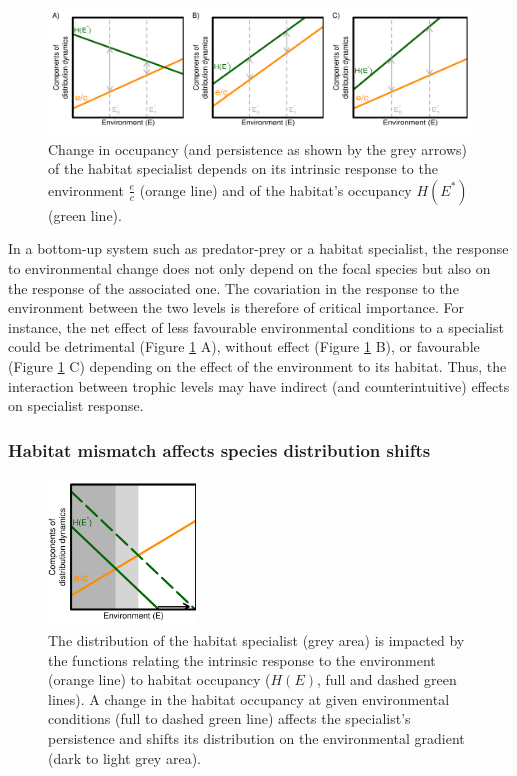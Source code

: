 \documentclass[12pt]{article}
\begin{document}
\begin{figure}
\hypertarget{fig:occ_plot}{%
\centering
\includegraphics[width=1\textwidth,height=\textheight]{./manuscript/img/concept_occ.png}
\caption{Change in occupancy (and persistence as shown by the grey
arrows) of the habitat specialist depends on its intrinsic response to
the environment \(\frac{e}{c}\) (orange line) and of the habitat's
occupancy \(H(E^{*})\) (green line).}\label{fig:occ_plot}
}
\end{figure}

In a bottom-up system such as predator-prey or a habitat specialist, the
response to environmental change does not only depend on the focal
species but also on the response of the associated one. The covariation
in the response to the environment between the two levels is therefore
of critical importance. For instance, the net effect of less favourable
environmental conditions to a specialist could be detrimental (Figure
\ref{fig:occ_plot} A), without effect (Figure \ref{fig:occ_plot} B), or
favourable (Figure \ref{fig:occ_plot} C) depending on the effect of the
environment to its habitat. Thus, the interaction between trophic levels
may have indirect (and counterintuitive) effects on specialist response.

\hypertarget{habitat-mismatch-affects-species-distribution-shifts}{%
\subsubsection{Habitat mismatch affects species distribution
shifts}\label{habitat-mismatch-affects-species-distribution-shifts}}

\begin{figure}
\hypertarget{fig:concept_mismatch}{%
\centering
\includegraphics[width=0.35\textwidth,height=\textheight]{./manuscript/img/concept_mismatch.png}
\caption{The distribution of the habitat specialist (grey area) is
impacted by the functions relating the intrinsic response to the
environment (orange line) to habitat occupancy (\(H(E)\), full and
dashed green lines). A change in the habitat occupancy at given
environmental conditions (full to dashed green line) affects the
specialist's persistence and shifts its distribution on the
environmental gradient (dark to light grey
area).}\label{fig:concept_mismatch}
}
\end{figure}
\end{document}

